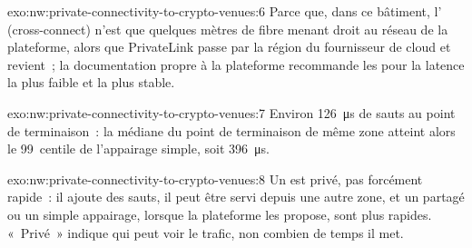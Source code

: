 \begin{solution}{exo:nw:private-connectivity-to-crypto-venues:6}
Parce que, dans ce bâtiment, l' (cross-connect) n'est que quelques mètres de fibre menant droit au réseau de la plateforme, alors que PrivateLink passe
par la région du fournisseur de cloud et revient~; la documentation propre à la plateforme recommande les  pour la latence la plus faible et la plus stable.
\end{solution}

\begin{solution}{exo:nw:private-connectivity-to-crypto-venues:7}
Environ \qty{126}{\micro\second} de sauts au point de terminaison~: la médiane du point de terminaison de même zone atteint alors le 99~centile de l'appairage simple, soit
\qty{396}{\micro\second}.
\end{solution}

\begin{solution}{exo:nw:private-connectivity-to-crypto-venues:8}
Un  est privé, pas forcément rapide~: il ajoute des sauts, il peut être servi depuis une autre zone, et un  partagé ou un simple appairage,
lorsque la plateforme les propose, sont plus rapides. «~Privé~» indique qui peut voir le trafic, non combien de temps il met.
\end{solution}

